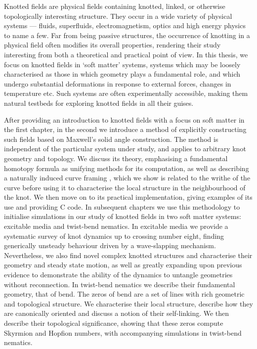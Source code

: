 Knotted fields are physical fields containing knotted, linked, or otherwise topologically interesting structure. They occur in a wide variety of physical systems --- fluids, superfluids, electromagnetism, optics and high energy physics to name a few. Far from being passive structures, the occurrence of knotting in a physical field often modifies its overall properties, rendering their study interesting from both a theoretical and practical point of view. In this thesis, we focus on knotted fields in `soft matter' systems, systems which may be loosely characterised as those in which geometry plays a fundamental role, and which undergo substantial deformations in response to external forces, changes in temperature etc. Such systems are often experimentally accessible, making them natural testbeds for exploring knotted fields in all their guises.  

After providing an introduction to knotted fields with a focus on soft matter in the first chapter, in the second we introduce a method of explicitly constructing such fields based on Maxwell's solid angle construction. The method is independent of the particular system under study, and applies to arbitrary knot geometry and topology. We discuss its theory, emphasising a fundamental homotopy formula as unifying methods for its computation, as well as describing a naturally induced curve framing , which we show is related to the writhe of the curve before using it to characterise the local structure in the neighbourhood of the knot. We then move on to its practical implementation, giving examples of its use and providing C code. In subsequent chapters we use this methodology to initialise simulations in our study of knotted fields in two soft matter systems: excitable media and twist-bend nematics. In excitable media we provide a systematic survey of knot dynamics up to crossing number eight, finding generically unsteady behaviour driven by a wave-slapping mechanism. Nevertheless, we also find novel complex knotted structures and characterise their geometry and steady state motion, as well as greatly expanding upon previous evidence to demonstrate the ability of the dynamics to untangle geometries without reconnection. In twist-bend nematics we describe their fundamental geometry, that of bend. The zeros of bend are a set of lines with rich geometric and topological structure. We characterise their local structure, describe how they are canonically oriented and discuss a notion of their self-linking. We then describe their topological significance, showing that these zeros compute Skyrmion and Hopfion numbers, with accompanying simulations in twist-bend nematics.   

